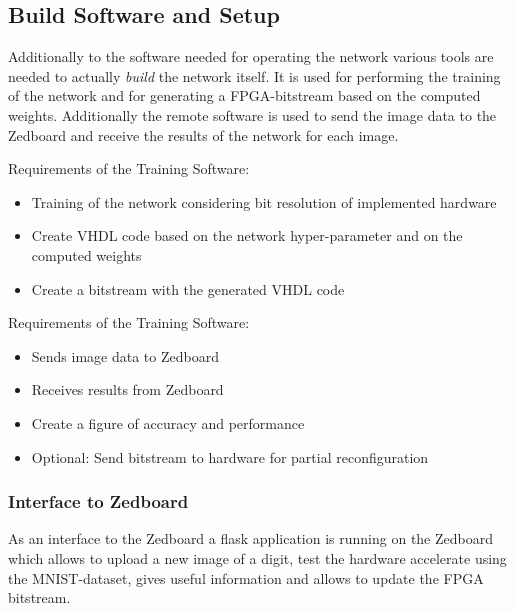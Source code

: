 \subsection{Build Software and Setup}

Additionally to the software needed for operating the network various tools are needed to actually \emph{build} the network itself. 
It is used for performing the training of the network and for generating a FPGA-bitstream based on the computed weights. Additionally the remote software is used to send the image data to the Zedboard and receive the results of the network for each image. 

Requirements of the Training Software:
\begin{itemize} 
	\item Training of the network considering bit resolution of implemented hardware
	\item Create VHDL code based on the network hyper-parameter and on the computed weights
	\item Create a bitstream with the generated VHDL code
\end{itemize}

Requirements of the Training Software:
\begin{itemize}
	\item Sends image data to Zedboard
	\item Receives results from Zedboard
	\item Create a figure of accuracy and performance   
	\item Optional: Send bitstream to hardware for partial reconfiguration
\end{itemize}

\subsubsection{Interface to Zedboard} \label{subsec:InterfaceRemoteZed}
As an interface to the Zedboard a flask application is running on the Zedboard which allows to upload a new image of a digit, test the hardware accelerate using the MNIST-dataset, gives useful information and allows to update the FPGA bitstream. 

